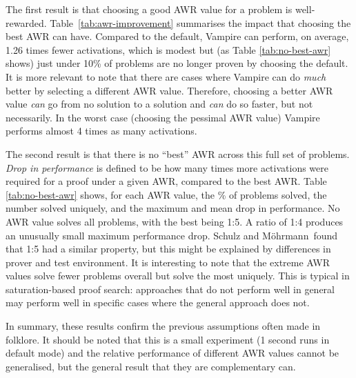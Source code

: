 \documentclass{llncs}
\newcommand{\sandm}{Schulz and M{\"{o}}hrmann}
\begin{document}
The first result is that choosing a good AWR value for a problem is well-rewarded.
Table~\ref{tab:awr-improvement} summarises the impact that choosing the best AWR can have.
Compared to the default, Vampire can perform, on average, 1.26 times fewer activations, which is modest but (as Table \ref{tab:no-best-awr} shows) just under 10\% of problems are no longer proven by choosing the default.
It is more relevant to note that there are cases where Vampire can do \emph{much} better by selecting a different AWR value.
Therefore, choosing a better AWR value \emph{can} go from no solution to a solution and \emph{can} do so faster, but not necessarily.
In the worst case (choosing the pessimal AWR value) Vampire performs almost 4 times as many activations.

The second result is that there is no ``best'' AWR across this full set of problems.
\emph{Drop in performance} is defined to be how many times more activations were required for a proof under a given AWR, compared to the best AWR.
Table \ref{tab:no-best-awr} shows, for each AWR value, the \% of problems solved, the number solved uniquely, and the maximum and mean drop in performance.
No AWR value solves all problems, with the best being 1:5. 
A ratio of 1:4 produces an unusually small maximum performance drop.
\sandm~found that 1:5 had a similar property, but this might be explained by differences in prover and test environment. It is interesting to note that the extreme AWR values solve fewer problems overall but solve the most uniquely. This is typical in saturation-based proof search: approaches that do not perform well in general may perform well in specific cases where the general approach does not.

In summary, these results confirm the previous assumptions often made in folklore. It should be noted that this is a small experiment (1 second runs in default mode) and the relative performance of different AWR values cannot be generalised, but the general result that they are complementary can.
\end{document}
